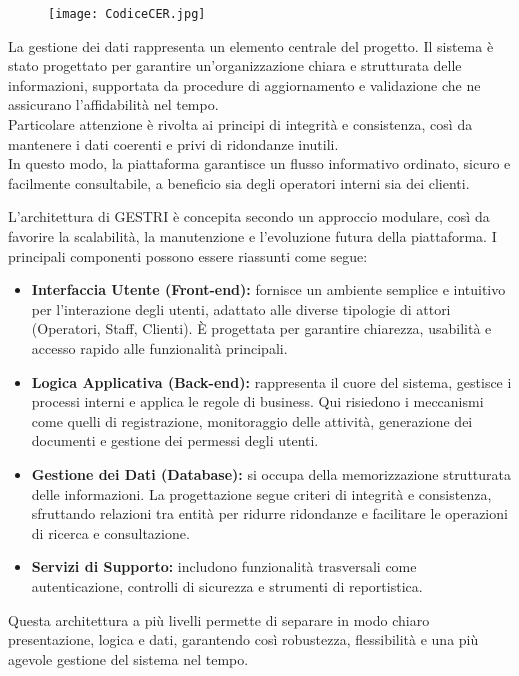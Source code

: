 \documentclass[a4paper]{report}
\begin{document}
\begin{figure}[H]
    \vspace{0.5cm}
    \centering
    \texttt{[image: CodiceCER.jpg]}
    \label*{Categorie principali dei Codici CER}
\end{figure}

\clearpage
{}
La gestione dei dati rappresenta un elemento centrale del progetto. 
Il sistema è stato progettato per garantire un’organizzazione chiara e strutturata delle informazioni, supportata da procedure di aggiornamento e validazione che ne assicurano l’affidabilità nel tempo.
\\
Particolare attenzione è rivolta ai principi di integrità e consistenza, così da mantenere i dati coerenti e privi di ridondanze inutili.
\\
In questo modo, la piattaforma garantisce un flusso informativo ordinato, sicuro e facilmente consultabile, a beneficio sia degli operatori interni sia dei clienti.	

L’architettura di GESTRI è concepita secondo un approccio modulare, così da favorire la scalabilità, la manutenzione e l’evoluzione futura della piattaforma. I principali componenti possono essere riassunti come segue:
\begin{itemize}
    \item \textbf{Interfaccia Utente (Front-end):} fornisce un ambiente semplice e intuitivo per l’interazione degli utenti, adattato alle diverse tipologie di attori (Operatori, Staff, Clienti). 
    È progettata per garantire chiarezza, usabilità e accesso rapido alle funzionalità principali.
    \item \textbf{Logica Applicativa (Back-end):} rappresenta il cuore del sistema, gestisce i processi interni e applica le regole di business. 
    Qui risiedono i meccanismi come quelli di registrazione, monitoraggio delle attività, generazione dei documenti e gestione dei permessi degli utenti.
    \item \textbf{Gestione dei Dati (Database):} si occupa della memorizzazione strutturata delle informazioni. 
    La progettazione segue criteri di integrità e consistenza, sfruttando relazioni tra entità per ridurre ridondanze e facilitare le operazioni di ricerca e consultazione.
    \item \textbf{Servizi di Supporto:} includono funzionalità trasversali come autenticazione, controlli di sicurezza e strumenti di reportistica.
\end{itemize}
Questa architettura a più livelli permette di separare in modo chiaro presentazione, logica e dati, garantendo così robustezza, flessibilità e una più agevole gestione del sistema nel tempo.
\end{document}
